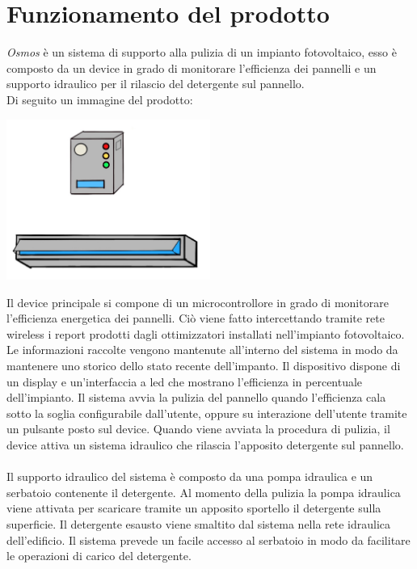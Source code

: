 \documentclass[a4paper, 12pt]{article}
\begin{document}
	\section{Funzionamento del prodotto}
	\emph{Osmos} è un sistema di supporto alla pulizia di un impianto fotovoltaico,
	esso è composto da un device in grado di monitorare l'efficienza dei pannelli 
	e un supporto idraulico per il rilascio del detergente sul pannello.\\Di seguito un immagine del prodotto:
	\begin{center}
		\includegraphics[width=0.5\textwidth]{Images/prototipo.jpg}
	\end{center}
	Il device principale si compone di un microcontrollore in grado di monitorare l'efficienza energetica dei pannelli.
	Ciò viene fatto intercettando tramite rete wireless i report prodotti dagli ottimizzatori installati nell'impianto fotovoltaico. Le informazioni raccolte vengono mantenute all'interno del sistema in modo da mantenere uno storico dello stato recente dell'impanto.
	Il dispositivo dispone di un display e un'interfaccia a led che mostrano l'efficienza in percentuale dell'impianto.
	Il sistema avvia la pulizia del pannello quando l'efficienza cala sotto la soglia configurabile dall'utente, 
	oppure su interazione dell'utente tramite un pulsante posto sul device.
	Quando viene avviata la procedura di pulizia, il device attiva un sistema idraulico che rilascia l'apposito detergente sul pannello.\\\\
	Il supporto idraulico del sistema è composto da una pompa idraulica e un serbatoio contenente il detergente. 
	Al momento della pulizia la pompa idraulica viene attivata per scaricare tramite un apposito sportello il detergente sulla superficie. Il detergente esausto viene smaltito dal sistema nella rete idraulica dell'edificio.
	Il sistema prevede un facile accesso al serbatoio in modo da facilitare le operazioni di carico del detergente.
\end{document}
